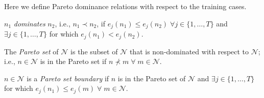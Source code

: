 \documentclass[preprint]{article}
\begin{document}
Here we define Pareto dominance relations with respect to the training cases. 

\medskip
{} $n_1$ {\it dominates} $n_2$, i.e., ${n_1} \prec {n_2}$, if $e_j(n_1) \leq e_j(n_2) \;
\forall j  \in \{1,\dots,T\}$ and $\exists j \in \{1,\dots,T\}$ for which $e_j(n_1) < e_j(n_2)$. \bigskip
\bigskip

\medskip
{} The {\it Pareto set} of $\mathcal{N}$ is the subset of $\mathcal{N}$ that is non-dominated with respect to $\mathcal{N}$; i.e., $n \in \mathcal{N}$ is in the Pareto set if $n \nprec m \; \forall \; m \in \mathcal{N}$. 
\bigskip

\medskip
{} $n \in \mathcal{N}$ is a {\it Pareto set boundary} if $n$ is in the Pareto set of $\mathcal{N}$ and $\exists j \in \{1,\dots,T\}$ for which $e_j(n_1) \leq e_j(m) \; \forall \; m \in \mathcal{N}$. \bigskip
\bigskip
\end{document}
